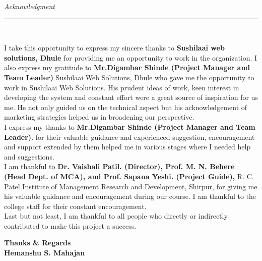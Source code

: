 \thispagestyle{empty}
\begin{flushright}
\textit{\Large \textcolor{black} Acknowledgment}\
\rule{6in}{.1pt}\\[0.5cm]
\end{flushright}
\justifying
\begin{spacing}{1.5}
I take this opportunity to express my sincere thanks to \textbf{ Sushilaai web solutions, Dhule}  for providing me an opportunity to work in the organization. I also express my gratitude to \textbf{Mr.Digambar Shinde (Project Manager and Team Leader)} Sushilaai Web Solutions, Dhule who gave me the opportunity to work in Sushilaai Web Solutions. His prudent ideas of work, keen interest in developing the system and constant effort were a great source of inspiration for us me. He not only guided us on the technical aspect but his acknowledgement of marketing strategies helped us in broadening our perspective.\\
	 I express my thanks to \textbf { Mr.Digambar Shinde (Project Manager and Team Leader)}. for their valuable guidance and experienced suggestion, encouragement and support extended by them helped me in various stages where I needed help and suggestions.\\
	 I am thankful to \textbf{Dr. Vaishali Patil. (Director), Prof. M. N. Behere (Head Dept. of MCA), and Prof. Sapana Yeshi. (Project Guide),  } R. C. Patel Institute of Management Research and Development, Shirpur, for giving me his valuable guidance and encouragement during our course. I am thankful to the college staff for their constant encouragement.\\
	 Last but not least, I am thankful to all people who directly or indirectly contributed to make this project a success.\\

	
 	
	
	
\begin{flushright}
\begin{spacing}{1}
\textbf{Thanks \& Regards}\\[.03cm]
\textbf{Hemanshu S. Mahajan}\\[.01cm]

\end{spacing}
\end{flushright}
\end{spacing}


